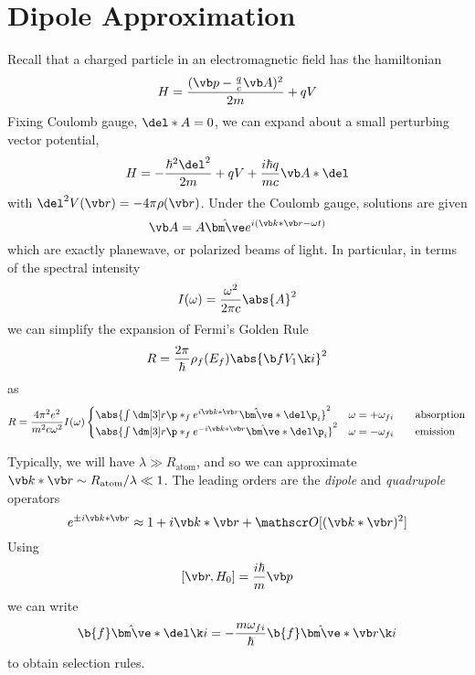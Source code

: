 \documentclass[12pt]{article}
\begin{document}
\section{Dipole Approximation}
Recall that a charged particle in an electromagnetic field has the hamiltonian
\begin{equation}
    H = \frac{(\vb p- \frac{q}{c}\vb A)^2}{2m}+qV
\end{equation}
Fixing Coulomb gauge, \( \del*A=0 \), we can expand about a small perturbing vector potential,
\begin{equation}
    H=-\frac{\hbar^2\del^2}{2m}+qV + \frac{i\hbar q}{mc}\vb A*\del 
\end{equation}
with \( \del^2 V(\vb r) =-4\pi \rho(\vb r) \). Under the Coulomb gauge, solutions are given
\begin{equation}
    \vb A = A\hat{\bm \ve} e^{i(\vb k*\vb r-\omega t)}
\end{equation}
which are exactly planewave, or polarized beams of light. In particular, in terms of the spectral intensity
\begin{equation}
    I(\omega) = \frac{\omega^2}{2\pi c}\abs{A}^2
\end{equation}
we can simplify the expansion of Fermi's Golden Rule
\begin{equation}
    R = \frac{2\pi}{\hbar}\rho_f(E_f)\abs{\b f V_1 \k i}^2
\end{equation}
as
\begin{equation}
    R = \frac{4\pi^2 e^2}{m^2c\omega^2}I(\omega)\begin{cases}
        \abs{\int\dm[3]r \p\ast_f e^{i\vb k*\vb r}\hat{\bm \ve}*\del \p_i}^2 & \omega=+\omega_{fi} \qquad\text{absorption}\\
        \abs{\int\dm[3]r \p\ast_f e^{-i\vb k*\vb r}\hat{\bm \ve}*\del \p_i}^2 & \omega=-\omega_{fi} \qquad\text{emission}\\
    \end{cases}
\end{equation}

Typically, we will have \( \lambda\gg R_\text{atom} \), and so we can approximate \( \vb k*\vb r\sim R_\text{atom}/\lambda\ll 1 \). The leading orders are the \emph{dipole} and \emph{quadrupole} operators
\[ e^{\pm i\vb k*\vb r}\approx 1+i\vb k*\vb r+\mathscr O[(\vb k*\vb r)^2] \]
Using
\[ [\vb r, H_0]=\frac{i\hbar}{m}\vb p \]
we can write
\begin{equation}
    \b{f}\hat{\bm\ve}*\del \k i = -\frac{m\omega_{fi}}{\hbar}\b{f}\hat{\bm \ve}*\vb r\k i
\end{equation}
to obtain selection rules.
\end{document}
